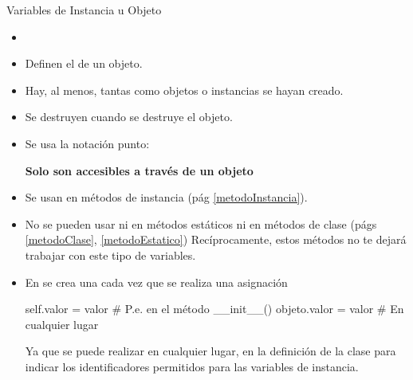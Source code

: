 \documentclass[10pt,envcountsect,spanish]{beamer}
\begin{document}
\begin{frame}[fragile,label={variablesInstancia}]{Variables de Instancia u Objeto}
\begin{itemize}
\item {}
\item Definen el  de un objeto.
\item Hay, al menos, tantas como objetos o instancias se hayan creado.
\item Se destruyen cuando se destruye el objeto.
\item Se usa la notación punto: 

\centerline{\textbf{Solo son accesibles a través de un  objeto}}

\item Se usan en métodos de instancia (pág \ref{metodoInstancia}).
\item No se pueden usar ni en métodos estáticos ni en métodos de clase (págs \ref{metodoClase}, \ref{metodoEstatico}) Recíprocamente, estos métodos  no te dejará trabajar con este tipo de variables.

\item En  se crea una cada vez que se  realiza una asignación

\begin{pyverbatim}[][frame=single]
self.valor = valor  # P.e. en el método __init__()
objeto.valor = valor # En cualquier lugar
\end{pyverbatim}
Ya que  se puede realizar en cualquier lugar,   en la definición de la clase para indicar los identificadores permitidos para las variables de instancia.
\end{itemize}
\end{frame}
\end{document}
